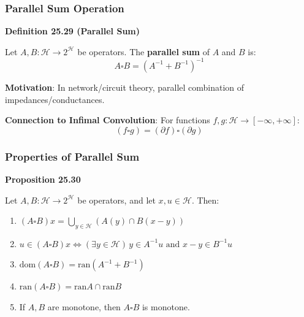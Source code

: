\documentclass[aspectratio=169,10pt]{beamer}
\begin{document}
\begin{frame}
  \frametitle{Parallel Sum Operation}

  \textbf{Definition 25.29 (Parallel Sum)}

  Let $A, B: \mathcal{H} \to 2^{\mathcal{H}}$ be operators. The \textbf{parallel sum} of $A$ and $B$ is:
  $$A \square B = (A^{-1} + B^{-1})^{-1}$$

  \vspace{0.3cm}

  \textbf{Motivation}: In network/circuit theory, parallel combination of impedances/conductances.

  \vspace{0.3cm}

  \textbf{Connection to Infimal Convolution}:
  For functions $f, g: \mathcal{H} \to [-\infty, +\infty]$:
  $$(f \square g) = (\partial f) \square (\partial g)$$

\end{frame}

\begin{frame}
  \frametitle{Properties of Parallel Sum}

  \textbf{Proposition 25.30}

  Let $A, B: \mathcal{H} \to 2^{\mathcal{H}}$ be operators, and let $x, u \in \mathcal{H}$. Then:

  \begin{enumerate}
    \item[(i)] $(A \square B)x = \bigcup_{y \in \mathcal{H}} (A(y) \cap B(x - y))$
    \item[(ii)] $u \in (A \square B)x \Leftrightarrow (\exists y \in \mathcal{H}) \, y \in A^{-1}u \text{ and } x - y \in B^{-1}u$
    \item[(iii)] $\text{dom}(A \square B) = \text{ran}(A^{-1} + B^{-1})$
    \item[(iv)] $\text{ran}(A \square B) = \text{ran} A \cap \text{ran} B$
    \item[(v)] If $A, B$ are monotone, then $A \square B$ is monotone.
  \end{enumerate}

\end{frame}
\end{document}
